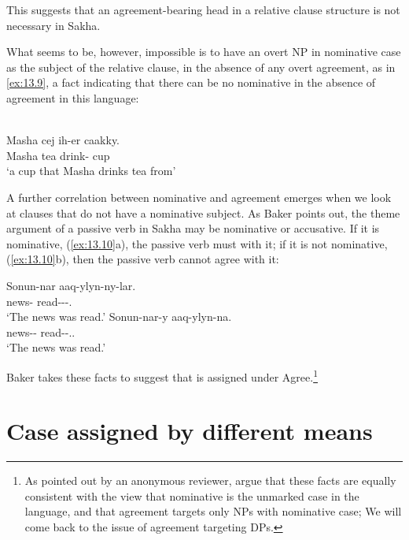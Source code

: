\documentclass[output=paper]{langsci/langscibook}
\begin{document}
This suggests that an agreement-bearing head in a relative clause structure is
not necessary in Sakha.

What seems to be, however, impossible is to have an overt NP in nominative case
as the subject of the relative clause, in the absence of any overt agreement,
as in \eqref{ex:13.9}, a fact indicating that there can be no nominative in the
absence of agreement in this language:

\ea%
    \label{ex:13.9} \parencite[30]{Baker2015}\\
    \gll \llap{*}Masha cej ih-er caakky.\\
          Masha tea drink-\Aor{}      cup\\
    \glt  ‘a cup that Masha drinks tea from’
\z

A further correlation between nominative and agreement emerges when we look at
clauses that do not have a nominative subject. As Baker points out, the theme
argument of a passive verb in Sakha may be nominative or accusative. If it is
nominative, (\ref{ex:13.10}a), the passive verb must  with it; if it
is not nominative, (\ref{ex:13.10}b), then the passive verb cannot agree
with it:

\ea%
    \label{ex:13.10} \parencite[32]{Baker2015}
	\ea
	\gll  Sonun-nar aaq-ylyn-ny-lar.\\
    news-\Pl{}  read-\Pass{}-\Pst{}-\Tpl.\Sbj{}\\
	\glt     ‘The news was read.’
	\ex
	\gll  Sonun-nar-y aaq-ylyn-na.\\
	    news-\Pl{}-\Acc{}  read-\Pass{}-\Pst{}.\Tsg.\Sbj{}\\
	\glt     ‘The news was read.’
    \z
\z

Baker takes these facts to suggest that \Nom{} is assigned under
Agree.\footnote{As pointed out by an anonymous reviewer, \citet{LevPre2015}
    argue that these facts are equally consistent with the view that
    nominative is the unmarked case in the language, and
    that agreement targets only NPs with nominative case;
We will come back to the issue of agreement targeting \Nom{} DPs.}

\section{Case assigned by different means}\label{sec:13.3}
\end{document}
